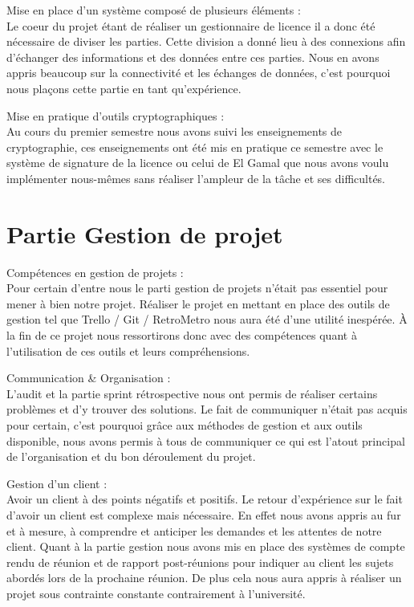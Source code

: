      Mise en place d'un système composé de plusieurs éléments :\\
     \newline
     Le coeur du projet étant de réaliser un gestionnaire de licence il a donc été nécessaire de diviser les parties. 
     Cette division a donné lieu à des connexions afin d'échanger des informations et des données entre ces parties. 
     Nous en avons appris beaucoup sur la connectivité et les échanges de données, c'est pourquoi nous plaçons cette partie en tant  qu'expérience.
     \newline
    
     Mise en pratique d'outils cryptographiques :\\
     \newline
     Au cours du premier semestre nous avons suivi les enseignements de cryptographie, ces enseignements ont été mis en pratique ce semestre avec le système de signature de la licence ou celui de 
     El Gamal que nous avons voulu implémenter nous-mêmes sans réaliser l'ampleur de la tâche et ses difficultés.
     \newline
     \newpage
\section{Partie Gestion de projet}
    Compétences en gestion de projets : \\
    \newline
    Pour certain d'entre nous le parti gestion de projets n'était pas essentiel pour mener à bien notre projet. Réaliser le projet en 
    mettant en place des outils de gestion tel que Trello / Git / RetroMetro nous aura été d'une utilité inespérée. 
    À la fin de ce projet nous ressortirons donc avec des compétences quant à l'utilisation de ces outils et leurs compréhensions.
    \newline

    Communication \& Organisation : \\
    \newline
    L'audit et la partie sprint rétrospective nous ont permis de réaliser certains problèmes et d'y trouver des solutions. Le fait de communiquer 
    n'était pas acquis pour certain, c'est pourquoi grâce aux méthodes de gestion et aux outils disponible, nous avons permis à tous de communiquer 
    ce qui est l'atout principal de l'organisation et du bon déroulement du projet.
    \newline

    Gestion d'un client :\\
    \newline
    Avoir un client à des points négatifs et positifs. Le retour d'expérience sur le fait d'avoir un client est complexe mais nécessaire. En effet nous avons appris au fur et 
    à mesure, à comprendre et anticiper les demandes et les attentes de notre client. Quant à la partie gestion nous avons mis en place des systèmes de compte rendu de réunion et de rapport post-réunions pour indiquer au client les sujets abordés lors 
    de la prochaine réunion. De plus cela nous aura appris à réaliser un projet sous contrainte constante contrairement à l'université.

